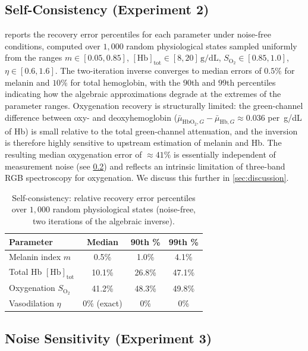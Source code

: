 \documentclass[10pt,twocolumn,a4paper]{article}
\theoremstyle{definition}
\newcommand{\Hb}{\mathrm{Hb}}
\newcommand{\HbO}{\mathrm{HbO_2}}
\newcommand{\vaso}{\eta}
\newcommand{\melan}{m}
\newcommand{\Hbconc}{[\Hb]_{\mathrm{tot}}}
\newcommand{\Soxy}{S_{\mathrm{O_2}}}
\begin{document}
\subsection{Self-Consistency (Experiment 2)}

 reports the recovery error percentiles
for each parameter under noise-free conditions, computed over
$1{,}000$ random physiological states sampled uniformly from the
ranges $\melan\in[0.05,0.85]$, $\Hbconc\in[8,20]\,\mathrm{g/dL}$,
$\Soxy\in[0.85,1.0]$, $\vaso\in[0.6,1.6]$. The two-iteration
inverse converges to median errors of $0.5\%$ for melanin and
$10\%$ for total hemoglobin, with the $90$th and $99$th
percentiles indicating how the algebraic approximations degrade at
the extremes of the parameter ranges. Oxygenation
recovery is structurally limited: the green-channel difference
between oxy- and deoxyhemoglobin
($\bar{\mu}_{\HbO,G}-\bar{\mu}_{\Hb,G}\approx 0.036$ per~g/dL of
Hb) is small relative to the total green-channel attenuation, and
the inversion is therefore highly sensitive to upstream estimation
of melanin and Hb. The resulting median oxygenation error of
$\approx 41\%$ is essentially independent of measurement noise (see
\cref{ssec:noise}) and reflects an intrinsic limitation of three-band
RGB spectroscopy for oxygenation. We discuss this further in
\cref{sec:discussion}.

\begin{table}[H]
\centering
\caption{Self-consistency: relative recovery error percentiles over
$1{,}000$ random physiological states (noise-free, two iterations of
the algebraic inverse).}
\label{tab:self-consistency}
\small
\begin{tabular}{lccc}
\toprule
Parameter & Median & 90th \% & 99th \% \\
\midrule
Melanin index $\melan$ & 0.5\% & 1.0\% & 4.1\% \\
Total Hb $\Hbconc$ & 10.1\% & 26.8\% & 47.1\% \\
Oxygenation $\Soxy$ & 41.2\% & 48.3\% & 49.8\% \\
Vasodilation $\vaso$ & 0\% (exact) & 0\% & 0\% \\
\bottomrule
\end{tabular}
\end{table}



\subsection{Noise Sensitivity (Experiment 3)}\label{ssec:noise}
\end{document}
